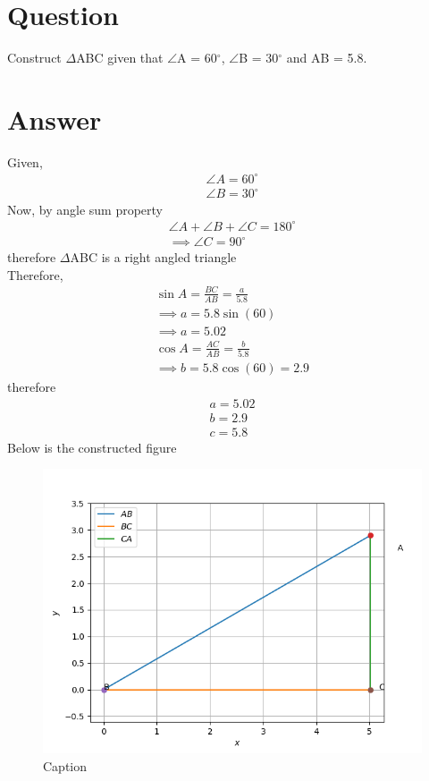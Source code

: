 \documentclass{article}
\begin{document}
\section*{Question}
Construct $\Delta$ABC given that $\angle$A = 60$^\circ$, $\angle$B = 30$^\circ$ and AB = 5.8.
\section*{Answer}
Given,
\begin{gather*}
    \angle A = 60^\circ \\
    \angle B = 30^\circ 
\end{gather*}
Now, by angle sum property
\begin{gather*}
    \angle A + \angle B + \angle C = 180^\circ \\
    \implies \angle C = 90^\circ
\end{gather*}
therefore $\Delta$ABC is a right angled triangle\\
Therefore, \\
\begin{gather*}
    \sin{A} = \frac{BC}{AB} = \frac{a}{5.8}\\
    \implies a = 5.8\sin{(60)}\\
    \implies a = 5.02\\
    \cos{A} = \frac{AC}{AB} = \frac{b}{5.8}\\
    \implies b = 5.8\cos{(60)} = 2.9
\end{gather*}
therefore 
\begin{gather*}
    a = 5.02\\
    b = 2.9 \\
    c = 5.8
\end{gather*}
\newpage
Below is the constructed figure
\begin{figure}[h!]
    \centering
    \includegraphics{Figure_2.png}
    \caption{Caption}
    \label{fig:my_label}
\end{figure}
\end{document}

